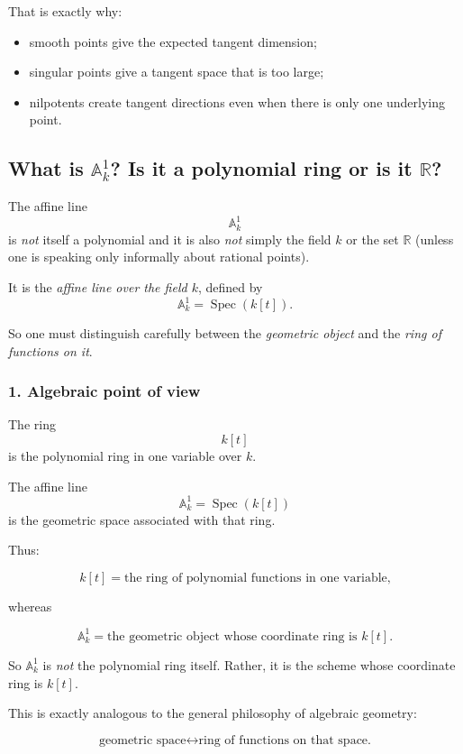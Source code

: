 \documentclass[12pt,a4paper]{article}
\theoremstyle{plain}
\theoremstyle{definition}      %
\begin{document}
	That is exactly why:
	
	\begin{itemize}
		\item smooth points give the expected tangent dimension;
		\item singular points give a tangent space that is too large;
		\item nilpotents create tangent directions even when there is only one underlying point.
	\end{itemize}
	
	\subsection*{What is \(\mathbb A^1_k\)? Is it a polynomial ring or is it \(\mathbb R\)?}
	
	The affine line
	\[
	\mathbb A^1_k
	\]
	is \emph{not} itself a polynomial and it is also \emph{not} simply the field \(k\) or the set \(\mathbb R\) (unless one is speaking only informally about rational points).
	
	It is the \emph{affine line over the field \(k\)}, defined by
	\[
	\mathbb A^1_k=\operatorname{Spec}(k[t]).
	\]
	
	So one must distinguish carefully between the \emph{geometric object} and the \emph{ring of functions on it}.
	
	\subsubsection*{1. Algebraic point of view}
	
	The ring
	\[
	k[t]
	\]
	is the polynomial ring in one variable over \(k\).
	
	The affine line
	\[
	\mathbb A^1_k=\operatorname{Spec}(k[t])
	\]
	is the geometric space associated with that ring.
	
	Thus:
	
	\[
	k[t]
	=
	\text{the ring of polynomial functions in one variable,}
	\]
	
	whereas
	
	\[
	\mathbb A^1_k
	=
	\text{the geometric object whose coordinate ring is }k[t].
	\]
	
	So \(\mathbb A^1_k\) is \emph{not} the polynomial ring itself. Rather, it is the scheme whose coordinate ring is \(k[t]\).
	
	This is exactly analogous to the general philosophy of algebraic geometry:
	
	\[
	\text{geometric space}
	\longleftrightarrow
	\text{ring of functions on that space.}
	\]
	
\end{document}
